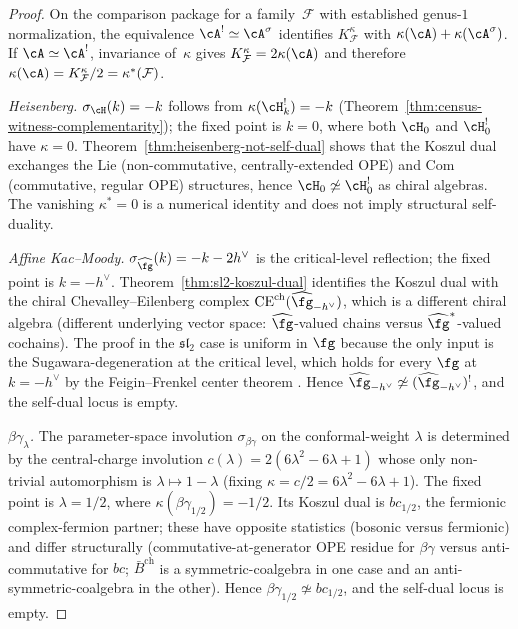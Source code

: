 \begin{proof}
On the comparison package for a family~$\mathcal F$ with established
genus-$1$ normalization, the equivalence
$\cA^!\simeq\cA^\sigma$ identifies
$K^\kappa_\mathcal{F}$ with
$\kappa(\cA)+\kappa(\cA^\sigma)$.
If $\cA\simeq\cA^!$, invariance of~$\kappa$ gives
$K^\kappa_\mathcal{F}=2\kappa(\cA)$ and therefore
$\kappa(\cA)=K^\kappa_\mathcal{F}/2=\kappa^*(\mathcal F)$.

\emph{Heisenberg.} $\sigma_\cH(k) = -k$ follows from
$\kappa(\cH_k^!) = -k$
\textup{(}Theorem~\ref{thm:census-witness-complementarity}\textup{)};
the fixed point is $k = 0$, where both $\cH_0$ and $\cH_0^!$ have
$\kappa = 0$. Theorem~\ref{thm:heisenberg-not-self-dual} shows that
the Koszul dual exchanges the Lie (non-commutative, centrally-extended
OPE) and Com (commutative, regular OPE) structures, hence
$\cH_0 \not\simeq \cH_0^!$ as chiral algebras. The vanishing
$\kappa^* = 0$ is a numerical identity and does not imply structural
self-duality.

\emph{Affine Kac--Moody.} \(\sigma_{\widehat{\fg}}(k)=-k-2h^\vee\)
is the critical-level reflection; the fixed point is
$k = -h^\vee$. Theorem~\ref{thm:sl2-koszul-dual} identifies the
Koszul dual with the chiral Chevalley--Eilenberg complex
$\mathrm{CE}^{\mathrm{ch}}(\widehat{\fg}_{-h^\vee})$, which is a
different chiral algebra (different underlying vector space:
$\widehat{\fg}$-valued chains versus $\widehat{\fg}^*$-valued
cochains). The proof in the $\mathfrak{sl}_2$ case is uniform in $\fg$
because the only input is the Sugawara-degeneration at the critical
level, which holds for every $\fg$ at $k = -h^\vee$ by the
Feigin--Frenkel center theorem \cite{Feigin-Frenkel}. Hence
$\widehat{\fg}_{-h^\vee} \not\simeq (\widehat{\fg}_{-h^\vee})^!$, and
the self-dual locus is empty.

\emph{$\beta\gamma_\lambda$.} The parameter-space involution
$\sigma_{\beta\gamma}$ on the conformal-weight $\lambda$ is determined
by the central-charge involution
$c(\lambda) = 2(6\lambda^2 - 6\lambda + 1)$ whose only non-trivial
automorphism is $\lambda \mapsto 1 - \lambda$ (fixing
$\kappa = c/2 = 6\lambda^2 - 6\lambda + 1$). The fixed point is
$\lambda = 1/2$, where $\kappa(\beta\gamma_{1/2}) = -1/2$. Its
Koszul dual is $bc_{1/2}$, the fermionic complex-fermion partner;
these have opposite statistics (bosonic versus fermionic) and differ
structurally (commutative-at-generator OPE residue for $\beta\gamma$
versus anti-commutative for $bc$; $\bar{B}^{\mathrm{ch}}$ is a
symmetric-coalgebra in one case and an anti-symmetric-coalgebra in
the other). Hence $\beta\gamma_{1/2} \not\simeq bc_{1/2}$, and the
self-dual locus is empty.


\end{proof}
